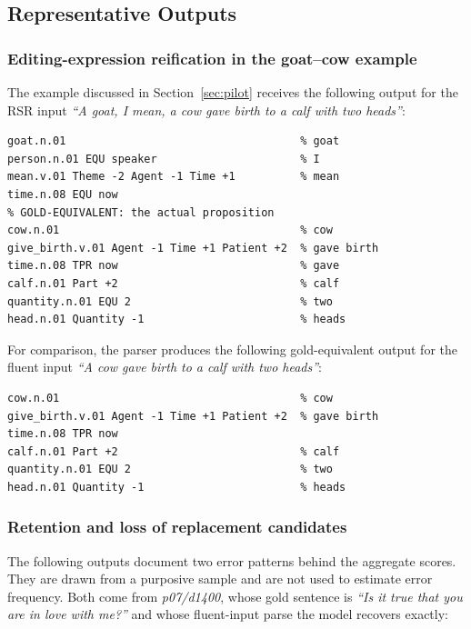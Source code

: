 \subsection{Representative Outputs}

\subsubsection{Editing-expression reification in the goat--cow example}
\label{app:pilot-goat-cow}

The example discussed in Section~\ref{sec:pilot} receives the following
output for the RSR input \textit{``A goat, I mean, a cow gave birth to a calf
with two heads''}:

\begin{lstlisting}[style=sbn]
% SPURIOUS: editing-expression material reified as content
goat.n.01                                    % goat
person.n.01 EQU speaker                      % I
mean.v.01 Theme -2 Agent -1 Time +1          % mean
time.n.08 EQU now
% GOLD-EQUIVALENT: the actual proposition
cow.n.01                                     % cow
give_birth.v.01 Agent -1 Time +1 Patient +2  % gave birth
time.n.08 TPR now                            % gave
calf.n.01 Part +2                            % calf
quantity.n.01 EQU 2                          % two
head.n.01 Quantity -1                        % heads
\end{lstlisting}

For comparison, the parser produces the following gold-equivalent output for
the fluent input \textit{``A cow gave birth to a calf with two heads''}:

\begin{lstlisting}[style=sbn]
cow.n.01                                     % cow
give_birth.v.01 Agent -1 Time +1 Patient +2  % gave birth
time.n.08 TPR now
calf.n.01 Part +2                            % calf
quantity.n.01 EQU 2                          % two
head.n.01 Quantity -1                        % heads
\end{lstlisting}

\subsubsection{Retention and loss of replacement candidates}

The following outputs document two error patterns behind the aggregate scores.
They are drawn from a purposive sample and are not used to estimate error
frequency. Both come from \textit{p07/d1400}, whose gold sentence is
\textit{``Is it true that you are in love with me?''} and whose fluent-input parse the
model recovers exactly:

